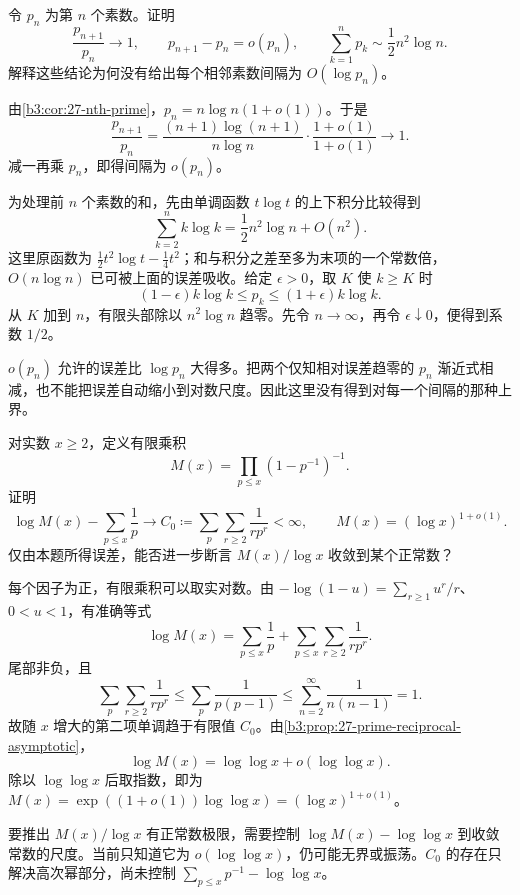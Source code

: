 \begin{exercise}\label{b3:ex:27-2}
令 \(p_n\) 为第 \(n\) 个素数。证明
\[
 \frac{p_{n+1}}{p_n}\longrightarrow1,\qquad
 p_{n+1}-p_n=o(p_n),\qquad
 \sum_{k=1}^n p_k\sim\frac12n^2\log n.
\]
解释这些结论为何没有给出每个相邻素数间隔为 \(O(\log p_n)\)。
\end{exercise}
\begin{solution}
由\cref{b3:cor:27-nth-prime}，\(p_n=n\log n(1+o(1))\)。于是
\[
 \frac{p_{n+1}}{p_n}
 =\frac{(n+1)\log(n+1)}{n\log n}\cdot
       \frac{1+o(1)}{1+o(1)}\longrightarrow1.
\]
减一再乘 \(p_n\)，即得间隔为 \(o(p_n)\)。

为处理前 \(n\) 个素数的和，先由单调函数 \(t\log t\) 的上下积分比较得到
\[
 \sum_{k=2}^n k\log k
 =\frac12n^2\log n+O(n^2).
\]
这里原函数为 \(\tfrac12t^2\log t-\tfrac14t^2\)；和与积分之差至多为末项的一个常数倍，\(O(n\log n)\) 已可被上面的误差吸收。给定 \(\epsilon>0\)，取 \(K\) 使 \(k\ge K\) 时
\[
 (1-\epsilon)k\log k\le p_k\le(1+\epsilon)k\log k.
\]
从 \(K\) 加到 \(n\)，有限头部除以 \(n^2\log n\) 趋零。先令 \(n\to\infty\)，再令 \(\epsilon\downarrow0\)，便得到系数 \(1/2\)。

\(o(p_n)\) 允许的误差比 \(\log p_n\) 大得多。把两个仅知相对误差趋零的 \(p_n\) 渐近式相减，也不能把误差自动缩小到对数尺度。因此这里没有得到对每一个间隔的那种上界。
\end{solution}

\begin{exercise}\label{b3:ex:27-3}
对实数 \(x\ge2\)，定义有限乘积
\[
 M(x)=\prod_{p\le x}(1-p^{-1})^{-1}.
\]
证明
\[
 \log M(x)-\sum_{p\le x}\frac1p
 \longrightarrow C_0\coloneqq\sum_p\sum_{r\ge2}\frac1{rp^r}<\infty,
 \qquad M(x)=(\log x)^{1+o(1)}.
\]
仅由本题所得误差，能否进一步断言 \(M(x)/\log x\) 收敛到某个正常数？
\end{exercise}
\begin{solution}
每个因子为正，有限乘积可以取实对数。由 \(-\log(1-u)=\sum_{r\ge1}u^r/r\)、\(0<u<1\)，有准确等式
\[
 \log M(x)=\sum_{p\le x}\frac1p
          +\sum_{p\le x}\sum_{r\ge2}\frac1{rp^r}.
\]
尾部非负，且
\[
 \sum_p\sum_{r\ge2}\frac1{rp^r}
 \le\sum_p\frac1{p(p-1)}
 \le\sum_{n=2}^\infty\frac1{n(n-1)}=1.
\]
故随 \(x\) 增大的第二项单调趋于有限值 \(C_0\)。由\cref{b3:prop:27-prime-reciprocal-asymptotic}，
\[
 \log M(x)=\log\log x+o(\log\log x).
\]
除以 \(\log\log x\) 后取指数，即为
\(M(x)=\exp((1+o(1))\log\log x)=(\log x)^{1+o(1)}\)。

要推出 \(M(x)/\log x\) 有正常数极限，需要控制
\(\log M(x)-\log\log x\) 到收敛常数的尺度。当前只知道它为 \(o(\log\log x)\)，仍可能无界或振荡。\(C_0\) 的存在只解决高次幂部分，尚未控制 \(\sum_{p\le x}p^{-1}-\log\log x\)。
\end{solution}

